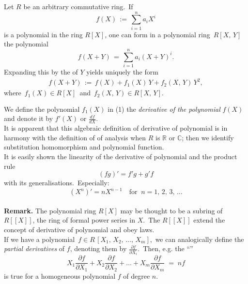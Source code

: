 \documentclass[12pt]{article}
\theoremstyle{definition}
\begin{document}
Let $R$ be an arbitrary commutative ring.\, If
$$f(X) \,:=\, \sum_{i=1}^na_iX^i$$
is a polynomial in the ring $R[X]$, one can form in a polynomial ring \,$R[X,\,Y]$\, the polynomial
$$f(X\!+\!Y) \,=\, \sum_{i=1}^na_i(X\!+\!Y)^i.$$
Expanding this by the  of $Y$ yields uniquely the form
\begin{align}
f(X\!+\!Y) \,:=\, f(X)+f_1(X)\,Y+f_2(X,\,Y)\,Y^2,
\end{align}
where\, $f_1(X) \in R[X]$\, and\, $f_2(X,\,Y) \in R[X,\,Y]$.

We define the polynomial $f_1(X)$ in (1) the {\em derivative of the polynomial} $f(X)$ and denote it by $f'(X)$ or 
$\displaystyle\frac{df}{dX}$.\\

It is apparent that this algebraic definition of derivative of polynomial is in harmony with the definition of  of analysis when $R$ is $\mathbb{R}$ or $\mathbb{C}$; then we identify substitution homomorphism and polynomial function.\\

It is easily shown the linearity of the derivative of polynomial and the product rule
$$(fg)' = f'g+g'f$$
with its generalisations.\, Especially:
$$(X^n)' = nX^{n-1} \quad\mbox{for}\;\; n = 1,\,2,\,3,\,\ldots$$\\

\textbf{Remark.}\; The polynomial ring $R[X]$ may be thought to be a subring of $R[[X]]$, the ring of formal power series in $X$.\, The  $R[[X]]$ extend the concept of derivative of polynomial and obey  laws.\\

If we have a polynomial\, $f \in R\,[X_1,\,X_2,\,\ldots,\,X_m]$,\, we can analogically define the {\em partial derivatives} of $f$, denoting them by $\displaystyle\frac{\partial f}{\partial X_i}$.\, Then, e.g. the ``'' 
$$X_1\frac{\partial f}{\partial X_1}+X_2\frac{\partial f}{\partial X_2}+\ldots+X_m\frac{\partial f}{\partial X_m}
\;=\; nf$$
is true for a homogeneous polynomial $f$ of degree $n$.




\end{document}
